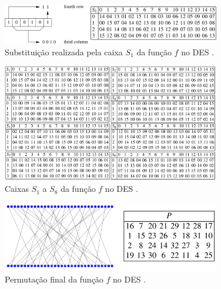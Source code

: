 \begin{frame}[allowframebreaks]
 \framebreak

\begin{figure}[h]
\centering
\includegraphics[width=0.85\textwidth,height=0.65\textheight,keepaspectratio]{figures/DES-S1box.png}
\caption{Substituição realizada pela caixa $S_1$ da função $f$ no DES \cite{paar2014}.}
\label{fig-DES-S1box}
\end{figure}

 \framebreak

\begin{figure}[h]
\centering
\includegraphics[width=0.85\textwidth,height=0.65\textheight,keepaspectratio]{figures/DES-S1-8.png}
\caption{Caixas $S_1$ a $S_8$ da função $f$ no DES \cite{paar2014}.}
\label{fig-DES-S1-8}
\end{figure}

 \framebreak

\begin{figure}[h]
\centering
\includegraphics[width=0.85\textwidth,height=0.65\textheight,keepaspectratio]{figures/DES-f_func-finalpermutation.png}
\caption{Permutação final da função $f$ no DES \cite{paar2014}.}
\label{fig-DES-f_func-finalpermutation}
\end{figure}

 \framebreak


\end{frame}

